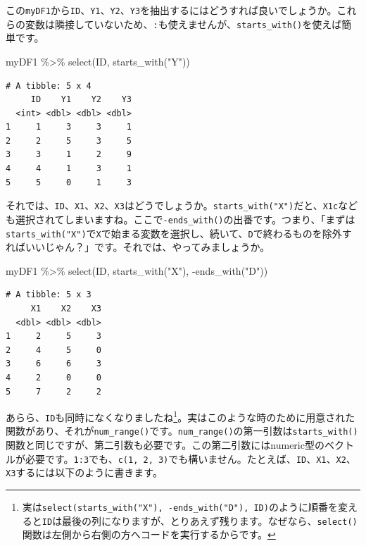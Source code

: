 \documentclass[
  a4paper,
  pandoc,
  ja=standard,
  jafont=haranoaji]{bxjsbook}
\newenvironment{Shaded}{\begin{snugshade}}{\end{snugshade}}
\newcommand{\FunctionTok}[1]{\textcolor[rgb]{0.28,0.35,0.67}{#1}}
\newcommand{\NormalTok}[1]{\textcolor[rgb]{0.00,0.48,0.65}{#1}}
\newcommand{\SpecialCharTok}[1]{\textcolor[rgb]{0.37,0.37,0.37}{#1}}
\newcommand{\StringTok}[1]{\textcolor[rgb]{0.13,0.47,0.30}{#1}}
\begin{document}
この\texttt{myDF1}から\texttt{ID}、\texttt{Y1}、\texttt{Y2}、\texttt{Y3}を抽出するにはどうすれば良いでしょうか。これらの変数は隣接していないため、\texttt{:}も使えませんが、\texttt{starts\_with()}を使えば簡単です。

\begin{Shaded}
\begin{Highlighting}[numbers=left,,]
\NormalTok{myDF1 }\SpecialCharTok{\%\textgreater{}\%}
  \FunctionTok{select}\NormalTok{(ID, }\FunctionTok{starts\_with}\NormalTok{(}\StringTok{"Y"}\NormalTok{))}
\end{Highlighting}
\end{Shaded}

\begin{verbatim}
# A tibble: 5 x 4
     ID    Y1    Y2    Y3
  <int> <dbl> <dbl> <dbl>
1     1     3     3     1
2     2     5     3     5
3     3     1     2     9
4     4     1     3     1
5     5     0     1     3
\end{verbatim}

それでは、\texttt{ID}、\texttt{X1}、\texttt{X2}、\texttt{X3}はどうでしょうか。\texttt{starts\_with("X")}だと、\texttt{X1c}なども選択されてしまいますね。ここで\texttt{-ends\_with()}の出番です。つまり、「まずは\texttt{starts\_with("X")}で\texttt{X}で始まる変数を選択し、続いて、\texttt{D}で終わるものを除外すればいいじゃん？」です。それでは、やってみましょうか。

\begin{Shaded}
\begin{Highlighting}[numbers=left,,]
\NormalTok{myDF1 }\SpecialCharTok{\%\textgreater{}\%}
  \FunctionTok{select}\NormalTok{(ID, }\FunctionTok{starts\_with}\NormalTok{(}\StringTok{"X"}\NormalTok{), }\SpecialCharTok{{-}}\FunctionTok{ends\_with}\NormalTok{(}\StringTok{"D"}\NormalTok{))}
\end{Highlighting}
\end{Shaded}

\begin{verbatim}
# A tibble: 5 x 3
     X1    X2    X3
  <dbl> <dbl> <dbl>
1     2     5     3
2     4     5     0
3     6     6     3
4     2     0     0
5     7     2     2
\end{verbatim}

あらら、\texttt{ID}も同時になくなりましたね\footnote{実は\texttt{select(starts\_with("X"),\ -ends\_with("D"),\ ID)}のように順番を変えると\texttt{ID}は最後の列になりますが、とりあえず残ります。なぜなら、\texttt{select()}関数は左側から右側の方へコードを実行するからです。}。実はこのような時のために用意された関数があり、それが\texttt{num\_range()}です。\texttt{num\_range()}の第一引数は\texttt{starts\_with()}関数と同じですが、第二引数も必要です。この第二引数にはnumeric型のベクトルが必要です。\texttt{1:3}でも、\texttt{c(1,\ 2,\ 3)}でも構いません。たとえば、\texttt{ID}、\texttt{X1}、\texttt{X2}、\texttt{X3}するには以下のように書きます。
\end{document}
